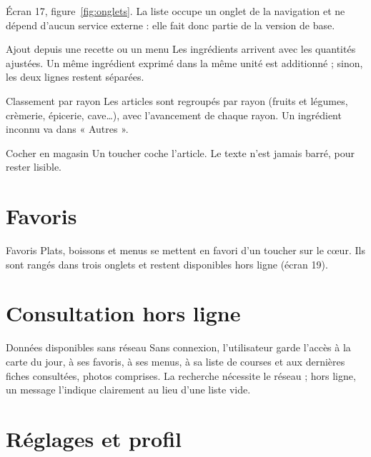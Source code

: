 Écran 17, figure~\ref{fig:onglets}. La liste occupe un onglet de la
navigation et ne dépend d'aucun service externe : elle fait donc partie de la
version de base.

\begin{exigence}[priorite=haute]{Ajout depuis une recette ou un menu}
  Les ingrédients arrivent avec les quantités ajustées. Un même ingrédient
  exprimé dans la même unité est additionné ; sinon, les deux lignes
  restent séparées.
\end{exigence}

\begin{exigence}[priorite=moyenne]{Classement par rayon}
  Les articles sont regroupés par rayon (fruits et légumes, crèmerie,
  épicerie, cave…), avec l'avancement de chaque rayon. Un ingrédient inconnu
  va dans « Autres ».
\end{exigence}

\begin{exigence}[priorite=haute]{Cocher en magasin}
  Un toucher coche l'article. Le texte n'est jamais barré, pour rester lisible.
\end{exigence}

\section{Favoris}

\begin{exigence}[priorite=haute]{Favoris}
  Plats, boissons et menus se mettent en favori d'un toucher sur le cœur. Ils
  sont rangés dans trois onglets et restent disponibles hors ligne
  (écran 19).
\end{exigence}

\section{Consultation hors ligne}

\begin{exigence}[priorite=haute]{Données disponibles sans réseau}
  Sans connexion, l'utilisateur garde l'accès à la carte du jour, à ses
  favoris, à ses menus, à sa liste de courses et aux dernières fiches
  consultées, photos comprises. La recherche nécessite le réseau ; hors
  ligne, un message l'indique clairement au lieu d'une liste vide.
\end{exigence}

\section{Réglages et profil}

